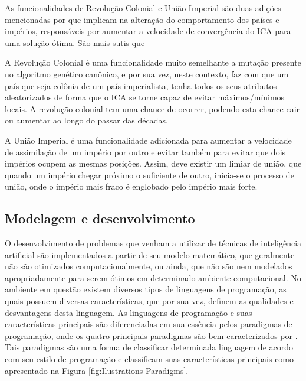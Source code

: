 As funcionalidades de Revolução Colonial e União Imperial são duas adições mencionadas por \cite{roche2011imperialist} que implicam na alteração do comportamento dos países e impérios, responsáveis por aumentar a velocidade de convergência do ICA para uma solução ótima. São mais sutis que 

A Revolução Colonial é uma funcionalidade muito semelhante a mutação presente no algoritmo genético canônico, e por sua vez, neste contexto, faz com que um país que seja colônia de um país imperialista, tenha todos os seus atributos aleatorizados de forma que o ICA se torne capaz de evitar máximos/mínimos locais. A revolução colonial tem uma chance de ocorrer, podendo esta chance cair ou aumentar ao longo do passar das décadas.

A União Imperial é uma funcionalidade adicionada para aumentar a velocidade de assimilação de um império por outro e evitar também para evitar que dois impérios ocupem as mesmas posições. Assim, deve existir um limiar de união, que quando um império chegar próximo o suficiente de outro, inicia-se o processo de união, onde o império mais fraco é englobado pelo império mais forte.
    
    
    
    
    
    
    
    
    
    
    
\subsection{Modelagem e desenvolvimento}
\label{Modelagem e desenvolvimento}

O desenvolvimento de problemas que venham a utilizar de técnicas de inteligência artificial são implementados a partir de seu modelo matemático, que geralmente não são otimizados computacionalmente, ou ainda, que não são nem modelados apropriadamente para serem ótimos em determinado ambiente computacional. No ambiente em questão existem diversos tipos de linguagens de programação, as quais possuem diversas características, que por sua vez, definem as qualidades e desvantagens desta linguagem. As linguagens de programação e suas características principais são diferenciadas em sua essência pelos paradigmas de programação, onde os quatro principais paradigmas são bem caracterizados por  \cite{normark2013overview}. Tais paradigmas são uma forma de classificar determinada linguagem de acordo com seu estilo de programação e classificam suas características principais como apresentado na Figura \ref{fig:Ilustrations-Paradigms}.


